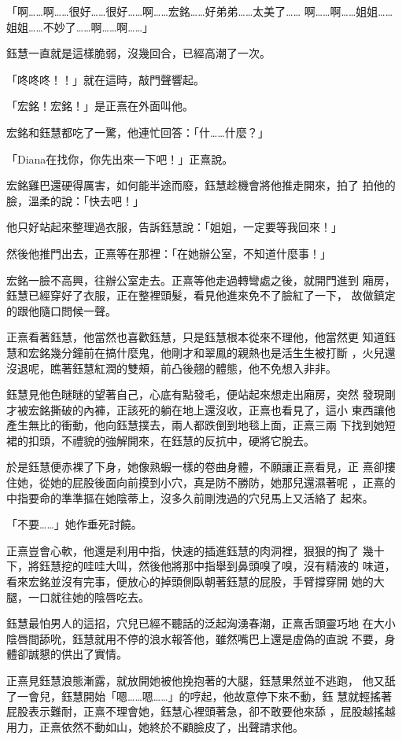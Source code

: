 「啊……啊……很好……很好……啊……宏銘……好弟弟……太美了……
啊……啊……姐姐……姐姐……不妙了……啊……啊……」

鈺慧一直就是這樣脆弱，沒幾回合，已經高潮了一次。

「咚咚咚！！」就在這時，敲門聲響起。

「宏銘！宏銘！」是正熹在外面叫他。

宏銘和鈺慧都吃了一驚，他連忙回答：「什……什麼？」

「Diana在找你，你先出來一下吧！」正熹說。

宏銘雞巴還硬得厲害，如何能半途而廢，鈺慧趁機會將他推走開來，拍了
拍他的臉，溫柔的說：「快去吧！」

他只好站起來整理過衣服，告訴鈺慧說：「姐姐，一定要等我回來！」

然後他推門出去，正熹等在那裡：「在她辦公室，不知道什麼事！」

宏銘一臉不高興，往辦公室走去。正熹等他走過轉彎處之後，就開門進到
廂房，鈺慧已經穿好了衣服，正在整裡頭髮，看見他進來免不了臉紅了一下，
故做鎮定的跟他隨口問候一聲。

正熹看著鈺慧，他當然也喜歡鈺慧，只是鈺慧根本從來不理他，他當然更
知道鈺慧和宏銘幾分鐘前在搞什麼鬼，他剛才和翠鳳的親熱也是活生生被打斷
，火兒還沒退呢，瞧著鈺慧紅潤的雙頰，前凸後翹的體態，他不免想入非非。

鈺慧見他色瞇瞇的望著自己，心底有點發毛，便站起來想走出廂房，突然
發現剛才被宏銘撕破的內褲，正該死的躺在地上還沒收，正熹也看見了，這小
東西讓他產生無比的衝動，他向鈺慧撲去，兩人都跌倒到地毯上面，正熹三兩
下找到她短裙的扣頭，不禮貌的強解開來，在鈺慧的反抗中，硬將它脫去。

於是鈺慧便赤裸了下身，她像熟蝦一樣的卷曲身體，不願讓正熹看見，正
熹卻摟住她，從她的屁股後面向前摸到小穴，真是防不勝防，她那兒還濕著呢
，正熹的中指要命的準準摳在她陰蒂上，沒多久前剛洩過的穴兒馬上又活絡了
起來。

「不要……」她作垂死討饒。

正熹豈會心軟，他還是利用中指，快速的插進鈺慧的肉洞裡，狠狠的掏了
幾十下，將鈺慧挖的哇哇大叫，然後他將那中指舉到鼻頭嗅了嗅，沒有精液的
味道，看來宏銘並沒有完事，便放心的掉頭側臥朝著鈺慧的屁股，手臂撐穿開
她的大腿，一口就往她的陰唇吃去。

鈺慧最怕男人的這招，穴兒已經不聽話的泛起洶湧春潮，正熹舌頭靈巧地
在大小陰唇間舔吮，鈺慧就用不停的浪水報答他，雖然嘴巴上還是虛偽的直說
不要，身體卻誠懇的供出了實情。

正熹見鈺慧浪態漸露，就放開她被他挽抱著的大腿，鈺慧果然並不逃跑，
他又舐了一會兒，鈺慧開始「嗯……嗯……」的哼起，他故意停下來不動，鈺
慧就輕搖著屁股表示難耐，正熹不理會她，鈺慧心裡頭著急，卻不敢要他來舔
，屁股越搖越用力，正熹依然不動如山，她終於不顧臉皮了，出聲請求他。

